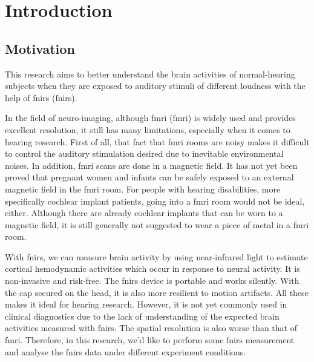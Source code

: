 \chapter{Introduction}

\section{Motivation}
This research aims to better understand the brain activities of normal-hearing subjects when they are exposed to auditory stimuli of different loudness with the help of \acrlong{fnirs} (\acrshort{fnirs}).

In the field of neuro-imaging, although \acrlong{fmri}  (\acrshort{fmri})  is widely used and provides excellent resolution, it still has many limitations, especially when it comes to hearing research. First of all, that fact that \acrshort{fmri} rooms are noisy makes it difficult to control the auditory stimulation desired due to inevitable environmental noises. In addition, \acrshort{fmri} scans are done in a magnetic field. It has not yet been proved that pregnant women and infants can be safely exposed to an external magnetic field in the \acrshort{fmri} room. For people with hearing disabilities, more specifically cochlear implant patients, going into a \acrshort{fmri} room would not be ideal, either. Although there are already cochlear implants that can be worn to a magnetic field, it is still generally not suggested to wear a piece of metal in a \acrshort{fmri} room.

With \acrshort{fnirs}, we can measure brain activity by using near-infrared light to estimate cortical hemodynamic activities which occur in response to neural activity. It is non-invasive and risk-free. The \acrshort{fnirs} device is portable and works silently. With the cap secured on the head, it is also more resilient to motion artifacts. All these makes it ideal for hearing research. However, it is not yet commonly used in clinical diagnostics due to the lack of understanding of the expected brain activities measured with \acrshort{fnirs}. The spatial resolution is also worse than that of \acrshort{fmri}. Therefore, in this research, we'd like to perform some \acrshort{fnirs} measurement and analyse the \acrshort{fnirs} data under different experiment conditions.

